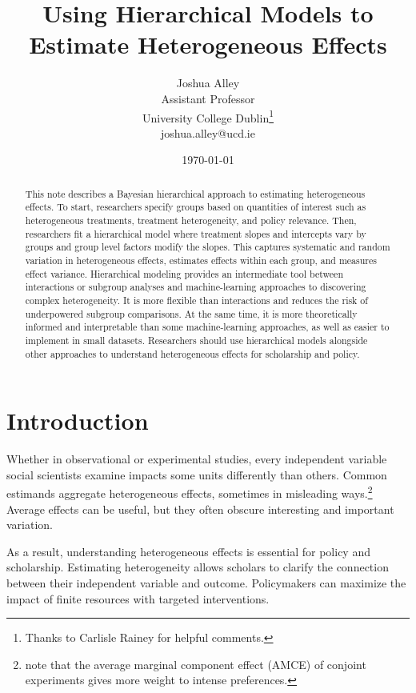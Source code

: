 \documentclass[12pt]{article}
\title{\textbf{Using Hierarchical Models to Estimate Heterogeneous Effects}}
\author{Joshua Alley \\
Assistant Professor \\
University College Dublin\thanks{Thanks to Carlisle Rainey for helpful comments.} \\
joshua.alley@ucd.ie
}
\date{\today}
\begin{document}
\maketitle 

\begin{abstract} 
This note describes a Bayesian hierarchical approach to estimating heterogeneous effects. 
To start, researchers specify groups based on quantities of interest such as heterogeneous treatments, treatment heterogeneity, and policy relevance.  
Then, researchers fit a hierarchical model where treatment slopes and intercepts vary by groups and group level factors modify the slopes.
This captures systematic and random variation in heterogeneous effects, estimates effects within each group, and measures effect variance. 
Hierarchical modeling provides an intermediate tool between interactions or subgroup analyses and machine-learning approaches to discovering complex heterogeneity. 
It is more flexible than interactions and reduces the risk of underpowered subgroup comparisons.
At the same time, it is more theoretically informed and interpretable than some machine-learning approaches, as well as easier to implement in small datasets. 
Researchers should use hierarchical models alongside other approaches to understand heterogeneous effects for scholarship and policy.
\end{abstract} 


\newpage 
\doublespace 


\section{Introduction}


Whether in observational or experimental studies, every independent variable social scientists examine impacts some units differently than others. 
Common estimands aggregate heterogeneous effects, sometimes in misleading ways.\footnote{\citet{Abramsonetal2022} note that the average marginal component effect (AMCE) of conjoint experiments gives more weight to intense preferences.} 
Average effects can be useful, but they often obscure interesting and important variation. 


As a result, understanding heterogeneous effects is essential for policy and scholarship. 
Estimating heterogeneity allows scholars to clarify the connection between their independent variable and outcome.
Policymakers can maximize the impact of finite resources with targeted interventions. 
\end{document}
